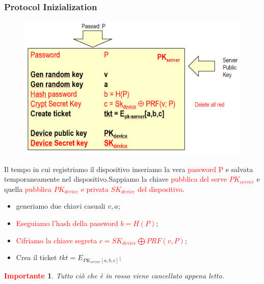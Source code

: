 \documentclass{book}
\newtheorem*{Importante}{\textbf{\textcolor{red}{Importante}}}
\begin{document}
    \subsubsection{Protocol Inizialization}
    \begin{figure}[h]
        \centering
        \includegraphics[scale=0.5]{2022-01-06-16-51-03.png}%
    \end{figure}
    Il tempo in cui registriamo il dispositivo inseriamo la vera \textcolor{red}{password P} e salvata temporaneamente nel dispositivo\@.Sappiamo la chiave \textcolor{red}{pubblica del serve \(PK_{server}\)} e quella \textcolor{red}{pubblica \(PK_{device}\) e privata \(SK_{device}\) del dispositivo}\@.
    \begin{itemize}
        \item generiamo due chiavi casuali \(v,a\);
        \item \textcolor{red}{Eseguiamo l'hash della password \(b=H(P)\)};
        \item \textcolor{red}{Cifriamo la chiave segreta \(c=SK_{device}\bigoplus PRF(v,P)\)};
        \item Crea il ticket \(tkt=E_{PK_{server}[a,b,c]}\);
    \end{itemize}
    \begin{Importante}
        Tutto ciò che è in rosso viene cancellato appena letto.
    \end{Importante}
    \newpage
\end{document}
